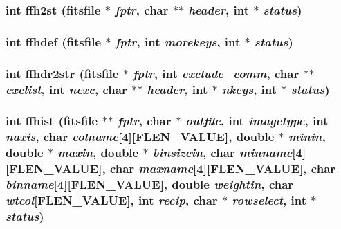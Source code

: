 \subsubsection{\setlength{\rightskip}{0pt plus 5cm}int ffh2st (\bf{fitsfile} $\ast$ {\em fptr}, char $\ast$$\ast$ {\em header}, int $\ast$ {\em status})}\label{src_2fitsio_8h_00930d127a2fe18c8822c389b64da8c2}


\subsubsection{\setlength{\rightskip}{0pt plus 5cm}int ffhdef (\bf{fitsfile} $\ast$ {\em fptr}, int {\em morekeys}, int $\ast$ {\em status})}\label{src_2fitsio_8h_628680d63bbae293fa53b48bdc0afbdd}


\subsubsection{\setlength{\rightskip}{0pt plus 5cm}int ffhdr2str (\bf{fitsfile} $\ast$ {\em fptr}, int {\em exclude\_\-comm}, char $\ast$$\ast$ {\em exclist}, int {\em nexc}, char $\ast$$\ast$ {\em header}, int $\ast$ {\em nkeys}, int $\ast$ {\em status})}\label{src_2fitsio_8h_909b37f8894feb8f3e02d35dceee3f53}


\subsubsection{\setlength{\rightskip}{0pt plus 5cm}int ffhist (\bf{fitsfile} $\ast$$\ast$ {\em fptr}, char $\ast$ {\em outfile}, int {\em imagetype}, int {\em naxis}, char {\em colname}[4][FLEN\_\-VALUE], double $\ast$ {\em minin}, double $\ast$ {\em maxin}, double $\ast$ {\em binsizein}, char {\em minname}[4][FLEN\_\-VALUE], char {\em maxname}[4][FLEN\_\-VALUE], char {\em binname}[4][FLEN\_\-VALUE], double {\em weightin}, char {\em wtcol}[FLEN\_\-VALUE], int {\em recip}, char $\ast$ {\em rowselect}, int $\ast$ {\em status})}\label{src_2fitsio_8h_abc1ac3fe3154b853aec9e8069a53104}


